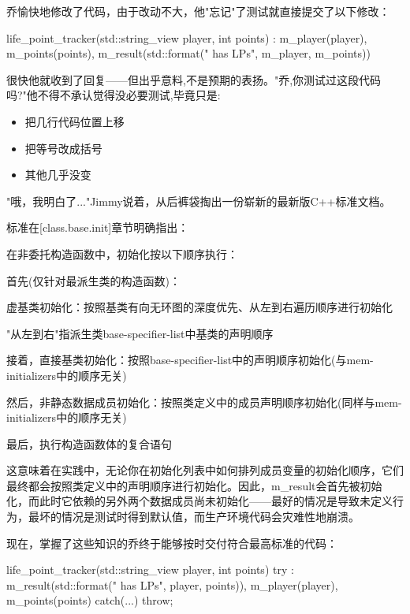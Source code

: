 乔愉快地修改了代码，由于改动不大，他"忘记"了测试就直接提交了以下修改：

\begin{cpp}
life_point_tracker(std::string_view player, int points)
: m_player(player), m_points(points),
  m_result(std::format("{} has {} LPs", m_player, m_points)) {}
\end{cpp}

很快他就收到了回复——但出乎意料,不是预期的表扬。"乔,你测试过这段代码吗?"他不得不承认觉得没必要测试,毕竟只是: 

\begin{itemize}
\item 
把几行代码位置上移

\item 
把等号改成括号

\item 
其他几乎没变
\end{itemize}

"哦，我明白了..."Jimmy说着，从后裤袋掏出一份崭新的最新版C++标准文档。

标准在[class.base.init]章节明确指出：

\begin{shell}
在非委托构造函数中，初始化按以下顺序执行：

首先(仅针对最派生类的构造函数)：

虚基类初始化：按照基类有向无环图的深度优先、从左到右遍历顺序进行初始化

"从左到右"指派生类base-specifier-list中基类的声明顺序

接着，直接基类初始化：按照base-specifier-list中的声明顺序初始化(与mem-initializers中的顺序无关)

然后，非静态数据成员初始化：按照类定义中的成员声明顺序初始化(同样与mem-initializers中的顺序无关)

最后，执行构造函数体的复合语句
\end{shell}

这意味着在实践中，无论你在初始化列表中如何排列成员变量的初始化顺序，它们最终都会按照类定义中的声明顺序进行初始化。因此，m\_result会首先被初始化，而此时它依赖的另外两个数据成员尚未初始化——最好的情况是导致未定义行为，最坏的情况是测试时得到默认值，而生产环境代码会灾难性地崩溃。

现在，掌握了这些知识的乔终于能够按时交付符合最高标准的代码：

\begin{cpp}
life_point_tracker(std::string_view player, int points)
try :
  m_result(std::format("{} has {} LPs", player, points)),
  m_player(player),
  m_points(points)
{ 
}
catch(...) {throw;}
\end{cpp}

